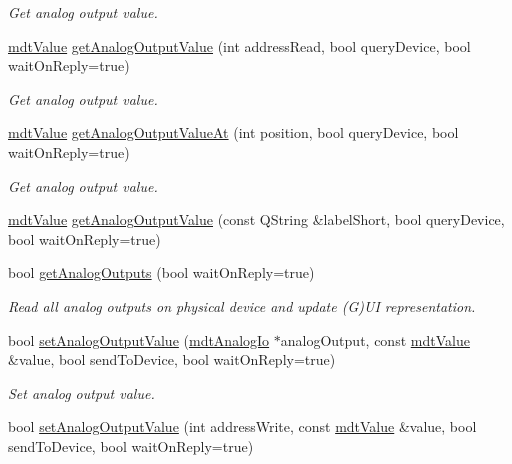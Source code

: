 \begin{DoxyCompactItemize}
\begin{DoxyCompactList}\small\item\em Get analog output value. \end{DoxyCompactList}\item 
\hyperlink{classmdt_value}{mdt\-Value} \hyperlink{classmdt_multi_io_device_a7427c034e96e34feb6464b282af15c47}{get\-Analog\-Output\-Value} (int address\-Read, bool query\-Device, bool wait\-On\-Reply=true)
\begin{DoxyCompactList}\small\item\em Get analog output value. \end{DoxyCompactList}\item 
\hyperlink{classmdt_value}{mdt\-Value} \hyperlink{classmdt_multi_io_device_a0ae171b83ddef7ba6cf0dcc3e0a2761c}{get\-Analog\-Output\-Value\-At} (int position, bool query\-Device, bool wait\-On\-Reply=true)
\begin{DoxyCompactList}\small\item\em Get analog output value. \end{DoxyCompactList}\item 
\hyperlink{classmdt_value}{mdt\-Value} \hyperlink{classmdt_multi_io_device_a48da998a4ef7b9a4f777dc180564e4e3}{get\-Analog\-Output\-Value} (const Q\-String \&label\-Short, bool query\-Device, bool wait\-On\-Reply=true)
\item 
bool \hyperlink{classmdt_multi_io_device_a4adc06753c0d23861e19d6c206b207cb}{get\-Analog\-Outputs} (bool wait\-On\-Reply=true)
\begin{DoxyCompactList}\small\item\em Read all analog outputs on physical device and update (G)U\-I representation. \end{DoxyCompactList}\item 
bool \hyperlink{classmdt_multi_io_device_a595ac7361c90bc48d8ef13b8a3a33772}{set\-Analog\-Output\-Value} (\hyperlink{classmdt_analog_io}{mdt\-Analog\-Io} $\ast$analog\-Output, const \hyperlink{classmdt_value}{mdt\-Value} \&value, bool send\-To\-Device, bool wait\-On\-Reply=true)
\begin{DoxyCompactList}\small\item\em Set analog output value. \end{DoxyCompactList}\item 
bool \hyperlink{classmdt_multi_io_device_a7ea25ea6dacc415c29bdd75d9ede6227}{set\-Analog\-Output\-Value} (int address\-Write, const \hyperlink{classmdt_value}{mdt\-Value} \&value, bool send\-To\-Device, bool wait\-On\-Reply=true)

\end{DoxyCompactItemize}
